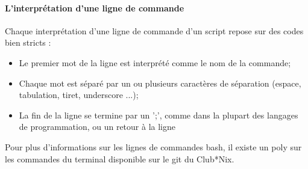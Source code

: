 \paragraph{L'interprétation d'une ligne de commande}

Chaque interprétation d'une ligne de commande d'un script repose sur des codes bien stricts :
\begin{itemize}
  \item Le premier mot de la ligne est interprété comme le nom de la commande;
  \item Chaque mot est séparé par un ou plusieurs caractères de séparation (espace, tabulation, tiret, underscore ...);
  \item La fin de la ligne se termine par un ';', comme dans la plupart des langages de programmation, ou un retour à la ligne
\end{itemize}


Pour plus d'informations sur les lignes de commandes bash, il existe un poly sur les commandes du terminal disponible sur le git du Club*Nix.

